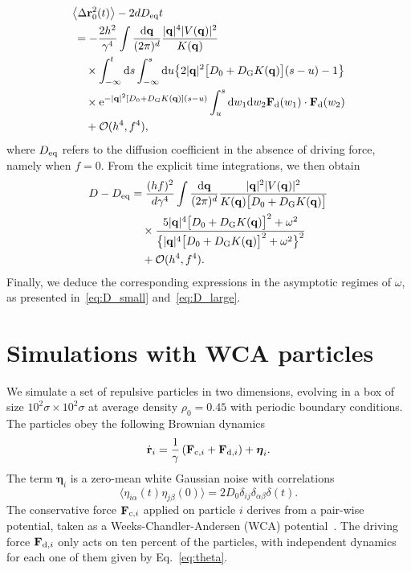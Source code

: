\documentclass[pre, superscriptaddress, twocolumn,pre]{revtex4-1}
\begin{document}
\begin{equation}
	\begin{aligned}
		&\big\langle\Delta{\bf r}^2_0(t)\big\rangle - 2 d D_{\rm eq} t
		\\
		&\,= - \frac{2h^2}{\gamma^4} \int \frac{{\rm d}{\bf q}}{(2\pi)^d} \frac{|{\bf q}|^4 |V({\bf q})|^2}{K({\bf q})}
		\\
		&\,\quad\times \int_{-\infty}^t{\rm d}s \int_{-\infty}^s{\rm d}u \big\{ 2|{\bf q}|^2\big[D_0+D_{\rm G}K({\bf q})\big](s-u) - 1\big\}
		\\
		&\,\quad\times {\rm e}^{ -|{\bf q}|^2[D_0+D_{\rm G}K({\bf q})](s-u)} \int_u^s {\rm d}w_1{\rm d}w_2 {\bf F}_{\rm d}(w_1)\cdot{\bf F}_{\rm d}(w_2)
		\\
		&\,\quad + {\cal O}(h^4,f^4) ,
	\end{aligned}
\end{equation}
where $D_{\rm eq}$ refers to the diffusion coefficient in the absence of driving force, namely when $f=0$. From the explicit time integrations, we then obtain
\begin{equation}
	\begin{aligned}
		D - D_{\rm eq} &= \frac{(hf)^2}{d\gamma^4} \int \frac{{\rm d}{\bf q}}{(2\pi)^d} \frac{|{\bf q}|^2|V({\bf q})|^2}{K({\bf q})\big[D_0+D_{\rm G}K({\bf q})\big]}
		\\
		&\quad\times \frac{5|{\bf q}|^4\big[D_0+D_{\rm G}K({\bf q})\big]^2 + \omega^2}{ \big\{ |{\bf q}|^4\big[D_0+D_{\rm G}K({\bf q})\big]^2 + \omega^2 \big\}^2}
		\\
		&\quad + {\cal O}(h^4,f^4)  .
	\end{aligned}
\end{equation}
Finally, we deduce the corresponding expressions in the asymptotic regimes of $\omega$, as presented in~\eqref{eq:D_small} and~\eqref{eq:D_large}.


\section{Simulations with WCA particles}\label{sec:sim1}

We simulate a set of repulsive particles in two dimensions, evolving in a box  of size $10^2\sigma\times 10^2\sigma$ at average density $\rho_0=0.45$ with periodic boundary conditions. The particles obey the following Brownian dynamics
\begin{equation}\label{eq:xEOM}
	\dot{\bf r}_i = \frac{1}{\gamma} \left({\bf F}_{{\rm c},i} + {\bf F}_{{\rm d},i}\right) + {\boldsymbol\eta}_i .
\end{equation}
The term ${\boldsymbol\eta}_i$ is a zero-mean white Gaussian noise with correlations
\begin{equation}
	\langle \eta_{i\alpha}(t)\eta_{j\beta}(0)\rangle = 2D_0\delta_{ij}\delta_{\alpha\beta}\delta(t) .
\end{equation}
The conservative force ${\bf F}_{{\rm c},i}$ applied on particle $i$ derives from a pair-wise potential, taken as a Weeks-Chandler-Andersen (WCA) potential~\cite{WCA1971}. The driving force ${\bf F}_{{\rm d},i}$ only acts on ten percent of the particles, with independent dynamics for each one of them given by Eq.~\eqref{eq:theta}. 
\end{document}
